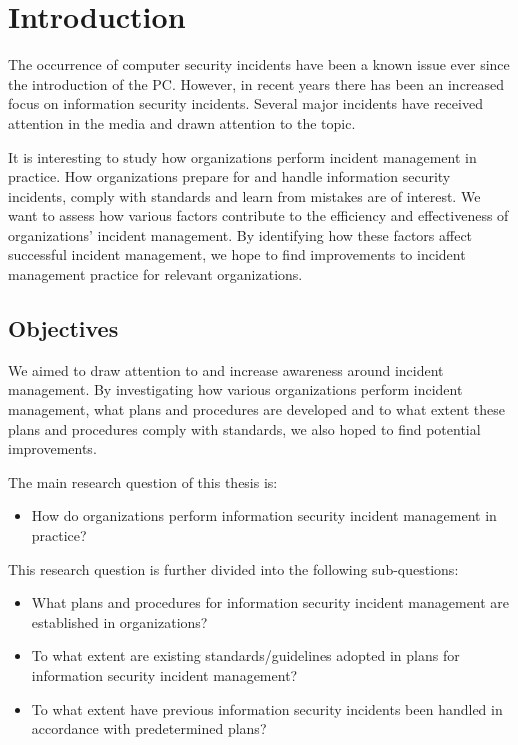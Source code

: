\chapter{Introduction}
\label{chp:introduction}
The occurrence of computer security incidents have been a known issue ever since the introduction of the PC. However, in recent years there has been an increased focus on information security incidents. Several major incidents have received attention in the media and drawn attention to the topic. %

It is interesting to study how organizations perform incident management in practice. How organizations prepare for and handle information security incidents, comply with standards and learn from mistakes are of interest. We want to assess how various factors contribute to the efficiency and effectiveness of organizations' incident management. By identifying how these factors affect successful incident management, we hope to find improvements to incident management practice for relevant organizations. 



\section{Objectives}
\label{sec:objectives}
We aimed to draw attention to and increase awareness around incident management. By investigating how various organizations perform incident management, what plans and procedures are developed and to what extent these plans and procedures comply with standards, we also hoped to find potential improvements.

The main research question of this thesis is:
\begin{itemize}
\item How do organizations perform information security incident management in practice?
\end{itemize}

This research question is further divided into the following sub-questions:

\begin{itemize}\itemsep-0.1cm
\item What plans and procedures for information security incident management are established in organizations?
\item To what extent are existing standards/guidelines adopted in plans for information security incident management?
\item To what extent have previous information security incidents been handled in accordance with predetermined plans? 
\end{itemize}

